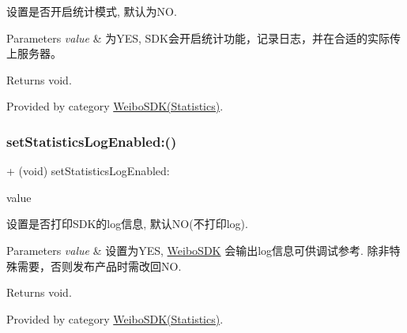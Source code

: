 设置是否开启统计模式, 默认为\+NO. 
\begin{DoxyParams}{Parameters}
{\em value} & 为\+Y\+ES, S\+D\+K会开启统计功能，记录日志，并在合适的实际传上服务器。 \\
\hline
\end{DoxyParams}
\begin{DoxyReturn}{Returns}
void. 
\end{DoxyReturn}


Provided by category \mbox{\hyperlink{category_weibo_s_d_k_07_statistics_08_a0b32ee3e2b30059b93e7dea204b43818}{Weibo\+S\+D\+K(\+Statistics)}}.

\mbox{\label{interface_weibo_s_d_k_a2e009db32a6d059ff53e35ac211d57f9}} 
\subsubsection{\texorpdfstring{set\+Statistics\+Log\+Enabled\+:()}{setStatisticsLogEnabled:()}\hspace{0.1cm}{\footnotesize\ttfamily [1/3]}}
{\footnotesize\ttfamily + (void) set\+Statistics\+Log\+Enabled\+: \begin{DoxyParamCaption}\item[{(B\+O\+OL)}]{value }\end{DoxyParamCaption}}

设置是否打印\+S\+D\+K的log信息, 默认\+NO(不打印log). 
\begin{DoxyParams}{Parameters}
{\em value} & 设置为\+Y\+ES, \mbox{\hyperlink{interface_weibo_s_d_k}{Weibo\+S\+DK}} 会输出log信息可供调试参考. 除非特殊需要，否则发布产品时需改回\+NO. \\
\hline
\end{DoxyParams}
\begin{DoxyReturn}{Returns}
void. 
\end{DoxyReturn}


Provided by category \mbox{\hyperlink{category_weibo_s_d_k_07_statistics_08_a2e009db32a6d059ff53e35ac211d57f9}{Weibo\+S\+D\+K(\+Statistics)}}.

\mbox{\label{interface_weibo_s_d_k_a2e009db32a6d059ff53e35ac211d57f9}} 
